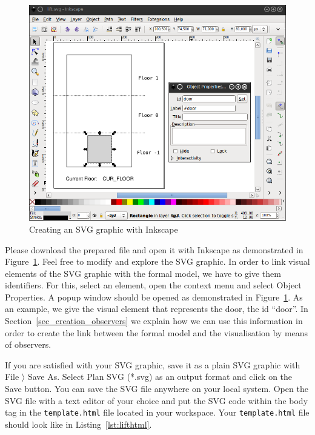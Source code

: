 \begin{figure}[!ht]
\begin{center}
	\includegraphics[width=\textwidth]{img/tutorial/tut_02.png}
	\caption{Creating an SVG graphic with Inkscape}
	\label{fig_tut_02_inkscape}
\end{center}
\end{figure}

Please download the prepared  file and open it with Inkscape as demonstrated in Figure~\ref{fig_tut_02_inkscape}.
Feel free to modify and explore the SVG graphic.
In order to link visual elements of the SVG graphic with the formal model, we have to give them identifiers. 
For this, select an element, open the context menu and select \textsf{Object Properties}.
A popup window should be opened as demonstrated in Figure~\ref{fig_tut_02_inkscape}.
As an example, we give the visual element that represents the door, the id ``door''.
In Section~\ref{sec_creation_observers} we explain how we can use this information in order to create the link between the formal model and the visualisation by means of observers.

If you are satisfied with your SVG graphic, save it as a plain SVG graphic with \textsf{File $\rangle$ Save As}.
Select \textsf{Plan SVG (*.svg)} as an output format and click on the \textsf{Save} button.
You can save the SVG file anywhere on your local system. 
Open the SVG file with a text editor of your choice and put the SVG code within the body tag in the \texttt{template.html} file located in your workspace.
Your \texttt{template.html} file should look like in Listing~\ref{lst:lifthtml}.

